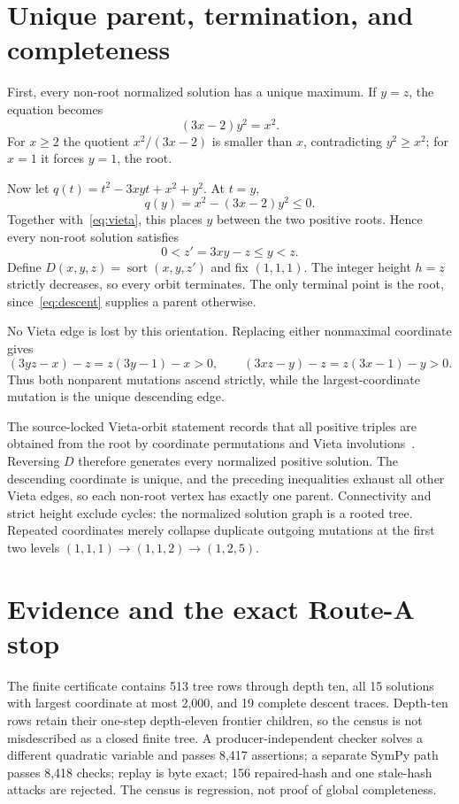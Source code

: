 \documentclass[9pt]{extarticle}
\begin{document}
\section{Unique parent, termination, and completeness}
First, every non-root normalized solution has a unique maximum.  If $y=z$,
the equation becomes
\[
 (3x-2)y^2=x^2.
\]
For $x\ge2$ the quotient $x^2/(3x-2)$ is smaller than $x$, contradicting
$y^2\ge x^2$; for $x=1$ it forces $y=1$, the root.

Now let $q(t)=t^2-3xyt+x^2+y^2$.  At $t=y$,
\[
 q(y)=x^2-(3x-2)y^2\le0.
\]
Together with~\eqref{eq:vieta}, this places $y$ between the two positive
roots.  Hence every non-root solution satisfies
\begin{equation}\label{eq:descent}
 0<z'=3xy-z\le y<z.
\end{equation}
Define $D(x,y,z)=\operatorname{sort}(x,y,z')$ and fix $(1,1,1)$.  The integer
height $h=z$ strictly decreases, so every orbit terminates.  The only terminal
point is the root, since~\eqref{eq:descent} supplies a parent otherwise.

No Vieta edge is lost by this orientation.  Replacing either nonmaximal
coordinate gives
\[
 (3yz-x)-z=z(3y-1)-x>0,\qquad
 (3xz-y)-z=z(3x-1)-y>0.
\]
Thus both nonparent mutations ascend strictly, while the largest-coordinate
mutation is the unique descending edge.

The source-locked Vieta-orbit statement records that all positive triples are
obtained from the root by coordinate permutations and Vieta
involutions~\cite{BGS16}.  Reversing $D$ therefore generates every normalized
positive solution.  The descending coordinate is unique, and the preceding
inequalities exhaust all other Vieta edges, so each non-root vertex has
exactly one parent.  Connectivity and strict height exclude cycles: the
normalized solution graph is a rooted tree.  Repeated coordinates merely
collapse duplicate outgoing mutations at the first two levels
$(1,1,1)\to(1,1,2)\to(1,2,5)$.

\section{Evidence and the exact Route-A stop}
The finite certificate contains 513 tree rows through depth ten, all 15
solutions with largest coordinate at most 2,000, and 19 complete descent
traces.  Depth-ten rows retain their one-step depth-eleven frontier children,
so the census is not misdescribed as a closed finite tree.  A
producer-independent checker solves a different quadratic variable and passes
8,417 assertions; a separate SymPy path passes 8,418 checks; replay is byte
exact; 156 repaired-hash and one stale-hash attacks are rejected.  The census
is regression, not proof of global completeness.
\end{document}
